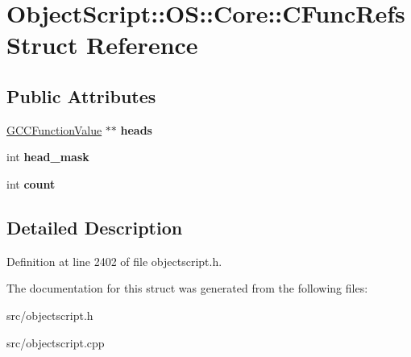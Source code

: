 \hypertarget{struct_object_script_1_1_o_s_1_1_core_1_1_c_func_refs}{}\section{Object\+Script\+:\+:OS\+:\+:Core\+:\+:C\+Func\+Refs Struct Reference}
\label{struct_object_script_1_1_o_s_1_1_core_1_1_c_func_refs}
\subsection*{Public Attributes}
\begin{DoxyCompactItemize}
\item 
\hyperlink{struct_object_script_1_1_o_s_1_1_core_1_1_g_c_c_function_value}{G\+C\+C\+Function\+Value} $\ast$$\ast$ {\bfseries heads}\hypertarget{struct_object_script_1_1_o_s_1_1_core_1_1_c_func_refs_a46650bed56de60a38825129c9bc440b3}{}\label{struct_object_script_1_1_o_s_1_1_core_1_1_c_func_refs_a46650bed56de60a38825129c9bc440b3}

\item 
int {\bfseries head\+\_\+mask}\hypertarget{struct_object_script_1_1_o_s_1_1_core_1_1_c_func_refs_ab3e2b293ba875b2d91e43ff17e6c6b01}{}\label{struct_object_script_1_1_o_s_1_1_core_1_1_c_func_refs_ab3e2b293ba875b2d91e43ff17e6c6b01}

\item 
int {\bfseries count}\hypertarget{struct_object_script_1_1_o_s_1_1_core_1_1_c_func_refs_a5c6385885f5cc2d669843f5771da2c9f}{}\label{struct_object_script_1_1_o_s_1_1_core_1_1_c_func_refs_a5c6385885f5cc2d669843f5771da2c9f}

\end{DoxyCompactItemize}


\subsection{Detailed Description}


Definition at line 2402 of file objectscript.\+h.



The documentation for this struct was generated from the following files\+:\begin{DoxyCompactItemize}
\item 
src/objectscript.\+h\item 
src/objectscript.\+cpp\end{DoxyCompactItemize}
